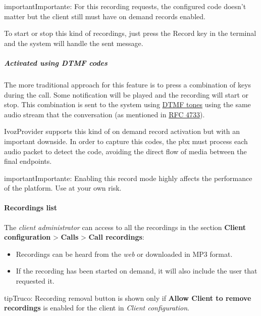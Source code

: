 \documentclass[letterpaper,10pt,spanish]{sphinxmanual}
\begin{document}
\begin{notice}{important}{Importante:}
For this recording requests, the configured code doesn't matter
but the client still must have on demand records enabled.
\end{notice}

To start or stop this kind of recordings, just press the Record key in the
terminal and the system will handle the sent message.


\subparagraph{Activated using \emph{DTMF} codes}
\label{administration_portal/client/vpbx/calls/call_recordings:activated-using-dtmf-codes}
The more traditional approach for this feature is to press a combination of
keys during the call. Some notification will be played and the recording will
start or stop. This combination is sent to the system using \href{https://es.wikipedia.org/wiki/Marcaci\%C3\%B3n\_por\_tonos}{DTMF tones} using the same audio
stream that the conversation (as mentioned in \href{https://tools.ietf.org/html/rfc4733}{RFC 4733}).

IvozProvider supports this kind of on demand record activation but with an
important downside. In order to capture this codes, the pbx must process each
audio packet to detect the code, avoiding the direct flow of media between the
final endpoints.

\begin{notice}{important}{Importante:}
Enabling this record mode highly affects the performance of the
platform. Use at your own risk.
\end{notice}


\paragraph{Recordings list}
\label{administration_portal/client/vpbx/calls/call_recordings:recordings-list}
The \emph{client administrator} can access to all the recordings in the section
\textbf{Client configuration} \textgreater{} \textbf{Calls} \textgreater{} \textbf{Call recordings}:
\begin{itemize}
\item {} 
Recordings can be heard from the \emph{web} or downloaded in MP3 format.

\item {} 
If the recording has been started on demand, it will also include the user
that requested it.

\end{itemize}

\begin{notice}{tip}{Truco:}
Recording removal button is shown only if \textbf{Allow Client to remove recordings} is enabled
for the client in \emph{Client configuration}.
\end{notice}
\end{document}
